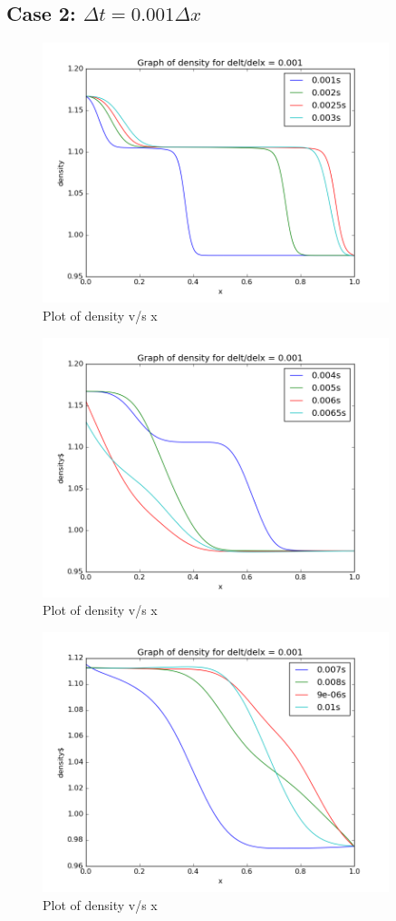 \documentclass[11pt, a4paper]{article}
\begin{document}
\subsection{Case 2: $\Delta t = 0.001 \Delta x$}
\begin{figure}[H]
 \centering
 \includegraphics[width = 0.9\textwidth]{lax_fed_3_1.png}
 \caption{Plot of density v/s x}
\end{figure}
\begin{figure}[H]
 \centering
 \includegraphics[width = 0.9\textwidth]{lax_fed_3_2.png}
 \caption{Plot of density v/s x}
\end{figure}
\begin{figure}[H]
 \centering
 \includegraphics[width = 0.9\textwidth]{lax_fed_3_3.png}
 \caption{Plot of density v/s x}
\end{figure}
\end{document}
